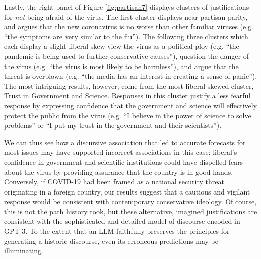 \documentclass{article}
\begin{document}
Lastly, the right panel of Figure \ref{fig:partisan7} displays clusters of justifications
for \emph{not} being afraid of the virus. The first cluster displays
near partisan parity, and argues that the new coronavirus is no worse
than other familiar viruses (e.g. ``the symptoms are very similar to the
flu''). The following three clusters which each display a slight liberal
skew view the virus as a political ploy (e.g. ``the pandemic is being
used to further conservative causes''), question the danger of the virus
(e.g. ``the virus is most likely to be harmless''), and argue that the
threat is overblown (e.g. ``the media has an interest in creating a
sense of panic''). The most intriguing results, however, come from the
most liberal-skewed cluster, Trust in Government and Science. Responses
in this cluster justify a less fearful response by expressing confidence
that the government and science will effectively protect the public from
the virus (e.g. ``I believe in the power of science to solve problems''
or ``I put my trust in the government and their scientists'').

We can thus see how a discursive association that led to accurate
forecasts for most issues may have supported incorrect associations in
this case; liberal's confidence in government and scientific
institutions could have dispelled fears about the virus by providing
assurance that the country is in good hands. Conversely, if COVID-19 had
been framed as a national security threat originating in a foreign
country, our results suggest that a cautious and vigilant response would
be consistent with contemporary conservative ideology. Of course, this
is not the path history took, but these alternative, imagined
justifications are consistent with the sophisticated and detailed model
of discourse encoded in GPT-3. To the extent that an LLM faithfully
preserves the principles for generating a historic discourse, even its
erroneous predictions may be illuminating.
\end{document}
